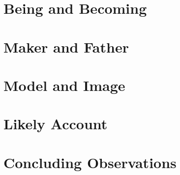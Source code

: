 
\section{Being and Becoming} %
\label{sec:Being and Becoming}




\section{Maker and Father} %
\label{sec:maker_and_father}




\section{Model and Image} %
\label{sec:model_and_image}




\section{Likely Account} %
\label{sec:likely_account}




\section{Concluding Observations} %
\label{sec:concluding_observations}




